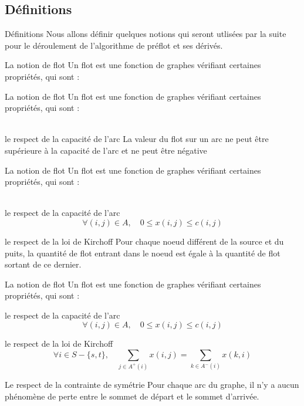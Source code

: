 \documentclass[hyperref={},
xcolor={dvipsnames,svgnames,table},10pt]{beamer}
\begin{document}
\subsection{Définitions}
\begin{frame}{Définitions}
		Nous allons définir quelques notions qui seront utlisées par la suite
		pour le déroulement de l'algorithme de préflot et ses dérivés.
\end{frame}

\begin{frame}{La notion de flot}
	Un flot est une fonction de graphes vérifiant certaines propriétés, qui sont : \vfill \vfill
\end{frame} 

\begin{frame}{La notion de flot}
	Un flot est une fonction de graphes vérifiant certaines propriétés, qui sont : ~\\~\\
	\begin{exampleblock}{le respect de la capacité de l'arc}
		La valeur du flot sur un arc ne peut être supérieure à la capacité de l'arc et ne peut être négative
	\end{exampleblock}\vfill
\end{frame} 

\begin{frame}{La notion de flot}
	Un flot est une fonction de graphes vérifiant certaines propriétés, qui sont :~\\~\\
	\begin{block}{le respect de la capacité de l'arc}
		$$\forall (i,j) \in A, \quad 0 \leq x(i,j) \leq c(i,j)$$
	\end{block}\vfill
	\begin{exampleblock}{le respect de la loi de Kirchoff}
		Pour chaque noeud différent de la source et du puits, la quantité de flot entrant dans le noeud
		est égale à la quantité de flot sortant de ce dernier.
	\end{exampleblock}\vfill
\end{frame} 

\begin{frame}{La notion de flot}
	Un flot est une fonction de graphes vérifiant certaines propriétés, qui sont : 
	\begin{block}{le respect de la capacité de l'arc}
		$$\forall (i,j) \in A, \quad 0 \leq x(i,j) \leq c(i,j)$$
	\end{block}\vfill
	\begin{block}{le respect de la loi de Kirchoff}
		$$\forall i \in S - \{s,t\}, \quad \sum_{j \in A^+(i)} x(i,j) = \sum_{k\in A^-(i)} x(k,i)$$
	\end{block}\vfill
	\begin{exampleblock}{Le respect de la contrainte de symétrie}
		Pour chaque arc du graphe, il n'y a aucun phénomène de perte entre le sommet de départ et le
		sommet d'arrivée.
	\end{exampleblock}\vfill
\end{frame} 
\end{document}
